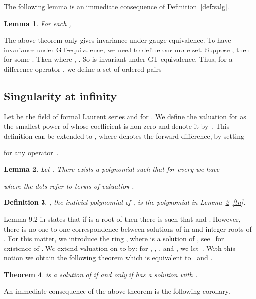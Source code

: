 \documentclass{article}
\newtheorem{theorem}{Theorem}[section]
\newtheorem{lemma}[theorem]{Lemma}
\newtheorem{definition}[theorem]{Definition}
\begin{document}
The following lemma is an immediate consequence of Definition~\ref{def:valg}.
\begin{lemma}
For each , 

\end{lemma}

The above theorem only gives invariance under gauge equivalence. 
To have invariance under GT-equivalence, we need to define one more set. 
Suppose , then  for some . 
Then 
where , . So  is invariant under GT-equivalence.
Thus, for a difference operator , we define a set of ordered pairs



\subsection{Singularity at infinity}

Let  be the field of formal Laurent series and  for . We define the valuation
for  as the smallest power of  whose coefficient is non-zero and denote it
by~.  This definition can be extended to , where
 denotes the forward difference, by setting

for any operator~.

\begin{lemma}
\label{ind}
Let .  There exists a polynomial  such that
for every  we have

where the dots refer to terms of valuation .
\end{lemma}


\begin{definition}
	, the {\em indicial polynomial} of , is the polynomial  in Lemma~\ref{ind}~\eqref{tn}.
\end{definition}

Lemma 9.2 in \cite{CHG10} states that if  is a root of  then there is  such that  and .  However, there is no one-to-one correspondence
between solutions of  in  and integer roots of
. For this matter, we introduce the ring , where  is a solution of , see~\cite{LF99} for existence of .  We extend valuation on  to  by: for
, , , and , we
let~.  With this notion we obtain the following theorem which is equivalent
to~\cite[Theorem 3.2.10]{YC11} and \cite[Lemma 6.1]{PS97}.

\begin{theorem}
  is a solution of  if and only if  has a solution  with . 
\end{theorem}

An immediate consequence of the above theorem is the following corollary.
\end{document}

